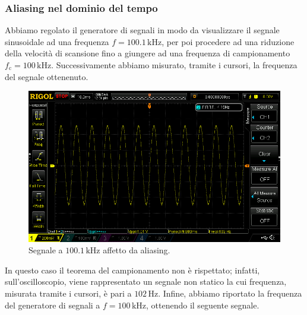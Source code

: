 \documentclass{article}
\begin{document}
			\subsubsection{Aliasing nel dominio del tempo}
				Abbiamo regolato il generatore di segnali in modo da visualizzare il segnale sinusoidale ad una frequenza $ f = 100.1 \, \mathrm{kHz} $, per poi procedere ad una riduzione della velocità di scansione fino a giungere ad una frequenza di campionamento $ f_{\mathrm{c}} = 100 \, \mathrm{kHz} $. Successivamente abbiamo misurato, tramite i cursori, la frequenza del segnale ottenenuto.
				\begin{figure}[h!]
					\centering
					\includegraphics[scale=0.4]{aliasing100_1kHz}
					\caption{Segnale a $ 100.1 \, \mathrm{kHz} $ affetto da aliasing.}
					\label{fig:aliasing100_1kHz}
				\end{figure}
				\newpage
				In questo caso il teorema del campionamento non è rispettato; infatti, sull’oscilloscopio, viene rappresentato un segnale non statico la cui frequenza, misurata tramite i cursori, è pari a $ 102 \, \mathrm{Hz} $.
				\newline
				Infine, abbiamo riportato la frequenza del generatore di segnali a $ f = 100 \, \mathrm{kHz} $, ottenendo il seguente segnale.
\end{document}
